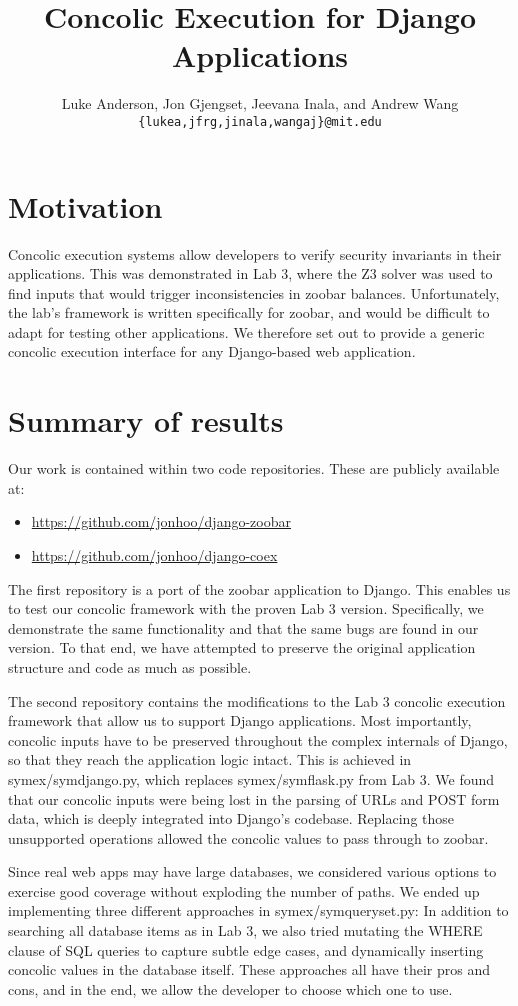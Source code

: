 \documentclass{article}
\author{
Luke Anderson, Jon Gjengset, Jeevana Inala, and Andrew Wang \\
\texttt{\{lukea,jfrg,jinala,wangaj\}@mit.edu}
}
\title{Concolic Execution for Django Applications}
\begin{document}
\maketitle
\section{Motivation}
Concolic execution systems allow developers to verify security
invariants in their applications. This was demonstrated in Lab 3,
where the Z3 solver was used to find inputs that would trigger
inconsistencies in zoobar balances. Unfortunately, the lab's
framework is written specifically for zoobar, and
would be difficult to adapt for testing other applications. We
therefore set out to provide a generic concolic execution interface for any Django-based
web application.


\section{Summary of results}

Our work is contained within two code repositories. These are
publicly available at:
\begin{itemize}
\item \url{https://github.com/jonhoo/django-zoobar}
\item \url{https://github.com/jonhoo/django-coex}
\end{itemize}

The first repository is a port of the zoobar application to Django.
This enables us to test our concolic framework with the proven Lab 3
version. Specifically, we demonstrate the same functionality and that
the same bugs are found in our version. To that end, we have attempted
to preserve the original application structure and code as much as
possible.

The second repository contains the modifications to the Lab 3 concolic
execution framework that allow us to support Django applications. Most
importantly, concolic inputs have to be preserved throughout the
complex internals of Django, so that they reach the application logic
intact. This is achieved in symex/symdjango.py, which replaces
symex/symflask.py from Lab 3. We found that our concolic inputs were
being lost in the parsing of URLs and POST form data, which is deeply
integrated into Django's codebase. Replacing those unsupported
operations allowed the concolic values to pass through to zoobar.

Since real web apps may have large databases, we considered various
options to exercise good coverage without exploding the number of
paths. We ended up implementing three different approaches in
symex/symqueryset.py: In addition to searching all database items as
in Lab 3, we also tried mutating the WHERE clause of SQL queries to
capture subtle edge cases, and dynamically inserting concolic values
in the database itself. These approaches all have their pros and cons,
and in the end, we allow the developer to choose which one to use.
\end{document}
